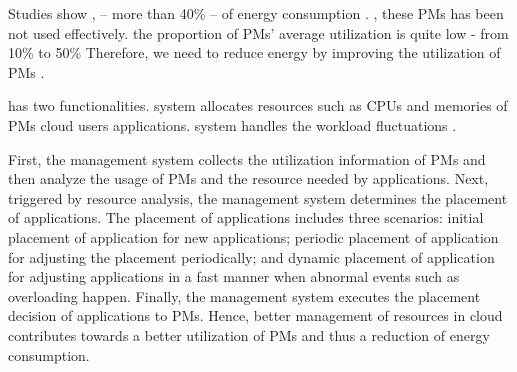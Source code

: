 Studies show \cite{Barroso:2007jt, Shen:2015hm},   -- more than 40\% -- of energy consumption . ,
these PMs has been not used effectively. the proportion of PMs' average utilization is quite low 
- from 10\% to 50\% \cite{Hameed:2016cmb} 
Therefore, we need to reduce energy by improving the utilization of PMs .

has two  functionalities.  system 
allocates resources such as CPUs and memories of PMs  cloud users  applications.  system 
handles the workload fluctuations .  

First, the management system collects the utilization information of PMs and then 
analyze the usage of PMs and the resource needed by applications. Next, triggered by resource analysis, the management system determines the 
placement of applications. The placement of applications includes three scenarios: initial placement of application for new applications; periodic placement of application for adjusting the placement periodically; 
and dynamic placement of application for adjusting applications in a fast manner when abnormal events such as overloading happen. Finally, 
the management system executes the placement decision of applications to PMs. Hence, better management of resources 
in cloud contributes towards a better utilization of PMs and thus a reduction of energy consumption.



